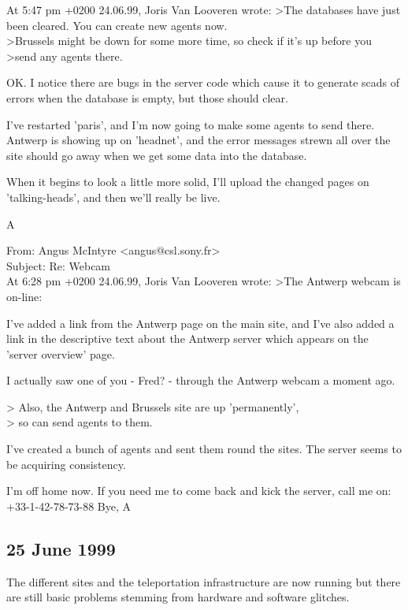 {\begin{mail}
At 5:47 pm +0200 24.06.99, Joris Van Looveren wrote:
>The databases have just been cleared. You can create new agents now.
\\>Brussels might be down for some more time, so check if it's up before you
\\>send any agents there.

OK. I notice there are bugs in the server code which cause it to 
generate scads of errors when the database is empty, but those should clear.

I've restarted 'paris', and I'm now going to make some agents to 
send there. Antwerp is showing up on 'headnet', and the error 
messages strewn all over the site should go away when we get 
some data into the database.

When it begins to look a little more solid, I'll upload the 
changed pages on 'talking-heads', and then we'll really be live.

	A
\end{mail}
\begin{mail}
From: Angus McIntyre <angus@csl.sony.fr>\\
Subject: Re: Webcam\\

At 6:28 pm +0200 24.06.99, Joris Van Looveren wrote:
>The Antwerp webcam is on-line:

I've added a link from the Antwerp page on the main site, 
and I've also added a link in the descriptive text about 
the Antwerp server which appears on the 'server overview' page. 

I actually saw one of you - Fred? - through the Antwerp 
webcam a moment ago.

> Also, the Antwerp and Brussels site are up 'permanently', 
\\> so can send agents to them.

I've created a bunch of agents and sent them round the sites. 
The server seems to be acquiring consistency.

I'm off home now. If you need me to come back and kick 
the server, call me on:
	+33-1-42-78-73-88
Bye,
	A
\end{mail}
}
\clearpage
\subsection*{25 June 1999} 

The different sites and the teleportation infrastructure are now running but there are still basic problems 
stemming from hardware and software glitches. 

